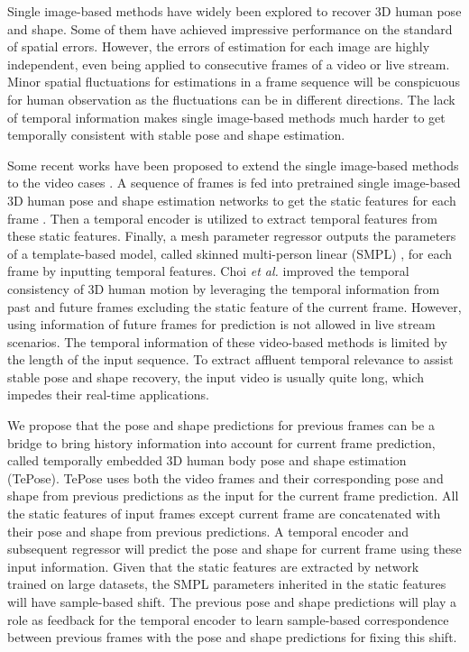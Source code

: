 \documentclass[10pt,twocolumn,letterpaper]{article}
\begin{document}
Single image-based methods \cite{bogo2016keep,tan2017indirect,lassner2017unite,pavlakos2019expressive,pavlakos2018learning,omran2018neural,kanazawa2018end,guler2019holopose,georgakis2020hierarchical,li2021hybrik} have widely been explored to recover 3D human pose and shape. Some of them have achieved impressive performance on the standard of spatial errors. However, the errors of estimation for each image are highly independent, even being applied to consecutive frames of a video or live stream. Minor spatial fluctuations for estimations in a frame sequence will be conspicuous for human observation as the fluctuations can be in different directions. The lack of temporal information makes single image-based methods much harder to get temporally consistent with stable pose and shape estimation.


Some recent works have been proposed to extend the single image-based methods to the video cases \cite{kanazawa2019learning,kocabas2020vibe,luo20203d}. A sequence of frames is fed into pretrained single image-based 3D human pose and shape estimation networks to get the static features for each frame \cite{kanazawa2018end,kolotouros2019learning}. Then a temporal encoder is utilized to extract temporal features from these static features. Finally, a mesh parameter regressor outputs the parameters of a template-based model, called skinned multi-person linear (SMPL)  \cite{loper2015smpl,pavlakos2019expressive}, for each frame by inputting temporal features. Choi \textit{et al.} \cite{choi2021beyond} improved the temporal consistency of 3D human motion by leveraging the temporal information from past and future frames excluding the static feature of the current frame. However, using information of future frames for prediction is not allowed in live stream scenarios. The temporal information of these video-based methods is limited by the length of the input sequence. To extract affluent temporal relevance to assist stable pose and shape recovery, the input video is usually quite long, which impedes their real-time applications.


We propose that the pose and shape predictions for previous frames can be a bridge to bring history information into account for current frame prediction, called temporally embedded 3D human body pose and shape estimation (TePose). TePose uses both the video frames and their corresponding pose and shape from previous predictions as the input for the current frame prediction. All the static features of input frames except current frame are concatenated with their pose and shape from previous predictions. A temporal encoder and subsequent regressor will predict the pose and shape for current frame using these input information. Given that the static features are extracted by network trained on large datasets, the SMPL parameters inherited in the static features will have sample-based shift. The previous pose and shape predictions will play a role as feedback for the temporal encoder to learn sample-based correspondence between previous frames with the pose and shape predictions for fixing this shift.
\end{document}

